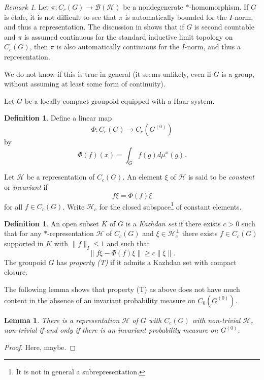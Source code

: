 \documentclass{article}
\newcommand{\h}{\mathcal{H}}
\theoremstyle{plain}
\newtheorem{lemma}[theorem]{Lemma}
\theoremstyle{definition}
\newtheorem{definition}[theorem]{Definition}
\theoremstyle{remark}
\newtheorem{remark}[theorem]{Remark}
\begin{document}
\begin{remark}\label{brem}
Let $\pi:C_c(G)\to \mathcal{B}(\h)$ be a nondegenerate $*$-homomorphism.  If $G$ is \'{e}tale, it is not difficult to see that $\pi$ is automatically bounded for the $I$-norm, and thus a representation.  The discussion in \cite[Appendix A]{Sims:2012fk} shows that if $G$ is second countable and $\pi$ is assumed continuous for the standard inductive limit topology on $C_c(G)$, then $\pi$ is also automatically continuous for the $I$-norm, and thus a representation.

We do not know if this is true in general (it seems unlikely, even if $G$ is a group, without assuming at least some form of continuity).  
\end{remark}

Let $G$ be a locally compact groupoid  equipped with a Haar system.  

\begin{definition}\label{constant}
Define a linear map
$$
\Phi:C_c(G)\to C_c(G^{(0)})
$$
by 
$$
\Phi(f)(x)=\int_{G} f(g) d\mu^x(g).
$$

Let $\h$ be a representation of $C_c(G)$.  An element $\xi$ of $\h$ is said to be \emph{constant} or \emph{invariant} if
$$
f\xi=\Phi(f)\xi
$$
for all $f\in C_c(G)$.  Write $\h_c$ for the closed subspace\footnote{It is not in general a subrepresentation.} of constant elements.
\end{definition}  

\begin{definition}\label{kaz}
An open subset $K$ of $G$ is a \emph{Kazhdan set} if there exists $c>0$ such that for any $*$-representation $\h$ of $C_c(G)$ and $\xi\in \h_c^\perp$ there exists $f\in C_c(G)$ supported in $K$ with $\|f\|_I\leq 1$ and such that 
$$
\|f\xi-\Phi(f)\xi\|\geq c\|\xi\|.
$$
The groupoid $G$ has \emph{property (T)} if it admits a Kazhdan set with compact closure.
\end{definition}

The following lemma shows that property (T) as above does not have much content in the absence of an invariant probability measure on $C_0(G^{(0)})$.

\begin{lemma}\label{inv meas}
There is a representation $\h$ of $G$ with $C_c(G)$ with non-trivial $\h_c$ non-trivial if and only if there is an invariant probability measure on $G^{(0)}$.  
\end{lemma}

\begin{proof}
Here, maybe.
\end{proof}
\end{document}
